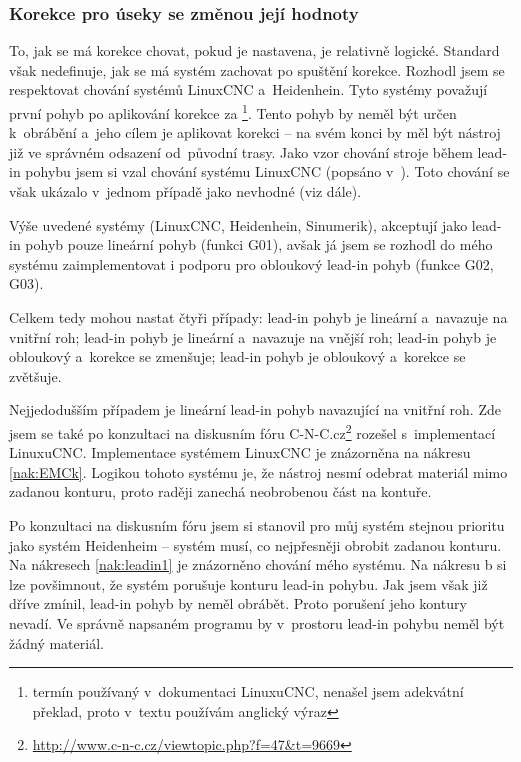 		\subsubsection{Korekce pro úseky se změnou její hodnoty}
			To, jak se má korekce chovat, pokud je nastavena, je relativně logické. Standard však nedefinuje, jak se má systém zachovat po spuštění korekce. Rozhodl jsem se respektovat chování systémů LinuxCNC\cite{emckor} a~Heidenhein\cite{heid}. Tyto systémy považují první pohyb po aplikování korekce za \footnote{termín používaný v~dokumentaci LinuxuCNC\cite{emckor}, nenašel jsem adekvátní překlad, proto v~textu používám anglický výraz}. Tento pohyb by neměl být určen k~obrábění a~jeho cílem je aplikovat korekci -- na svém konci by měl být nástroj již ve správném odsazení od~původní trasy. Jako vzor chování stroje během lead-in pohybu jsem si vzal chování systému LinuxCNC (popsáno v~\cite{emckor}). Toto chování se však ukázalo v~jednom případě jako nevhodné (viz dále).
			
			Výše uvedené systémy (LinuxCNC, Heidenhein, Sinumerik), akceptují jako lead-in pohyb pouze lineární pohyb (funkci G01), avšak  já jsem se rozhodl do mého systému zaimplementovat i podporu pro obloukový lead-in pohyb (funkce G02, G03).
			
			Celkem tedy mohou nastat čtyři případy: lead-in pohyb je lineární a~navazuje na vnitřní roh; lead-in pohyb je lineární a~navazuje na vnější roh; lead-in pohyb je obloukový a~korekce se zmenšuje; lead-in pohyb je obloukový a~korekce se zvětšuje.
			
			Nejjedodušším případem je lineární lead-in pohyb navazující na vnitřní roh. Zde jsem se také po konzultaci na diskusním fóru C-N-C.cz\footnote{\url{http://www.c-n-c.cz/viewtopic.php?f=47\&t=9669}} rozešel s~implementací LinuxuCNC. Implementace systémem LinuxCNC je znázorněna na nákresu \ref{nak:EMCk}. Logikou tohoto systému je, že nástroj nesmí odebrat materiál mimo zadanou konturu, proto raději zanechá neobrobenou část na kontuře\cite{emckor}.
			
			Po konzultaci na diskusním fóru jsem si stanovil pro můj systém stejnou prioritu jako systém Heidenheim\cite{heid} -- systém musí, co nejpřesněji obrobit zadanou konturu. Na nákresech \ref{nak:leadin1} je znázorněno chování mého systému. Na nákresu b si lze povšimnout, že systém porušuje konturu lead-in pohybu. Jak jsem však již dříve zmínil, lead-in pohyb by neměl obrábět. Proto porušení jeho kontury nevadí. Ve správně napsaném programu by v~prostoru lead-in pohybu neměl být žádný materiál.
			
